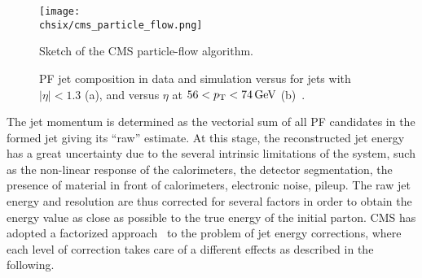 \begin{figure}[!htb]
 \begin{center}
  \texttt{[image: \\chsix/cms\_particle\_flow.png]}
 \end{center}
 \caption{Sketch of the CMS particle-flow algorithm.}
 \label{fig:PFalgo}
\end{figure}

\begin{figure}[!htb]
\centering
{}
\caption{PF jet composition in data and simulation versus \pt for jets with $|\eta| < 1.3$ (a), and versus $\eta$ at $56 < p_{\mathrm{T}} < 74\,\text{Ge\hspace{-.08em}V}$ (b)~\cite{Khachatryan:2016kdb}.}
\label{fig:PFjet_composition}
\end{figure}

The jet momentum is determined as the vectorial sum of all PF candidates in the formed jet giving its ``raw'' estimate. At this stage, the reconstructed jet energy has a great uncertainty due to the several intrinsic limitations of the system, such as the non-linear response of the calorimeters, the detector segmentation, the presence of material in front of calorimeters, electronic noise, pileup. The raw jet energy and resolution are thus corrected for several factors in order to obtain the energy value as close as possible to the true energy of the initial parton. CMS has adopted a factorized approach~\cite{1748-0221-6-11-P11002} to the problem of jet energy corrections, where each level of correction takes care of a different effects as described in the following.


